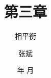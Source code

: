 \documentclass[dvipsnames, svgnames, x11names]{beamer}
\title{第三章}
\subtitle{相平衡}
\author{张斌}
\institute[理工系]{河北农业大学 理工系}
\date{\the\year 年 \the\month 月}
\begin{document}
	\begin{frame}
		\titlepage
		\thispagestyle{empty}
		\addtocounter{framenumber}{-1}
	\end{frame}

	\begin{frame}{}
        \begin{center}
            {\Huge {}}
        \end{center}
		\tableofcontents
		\thispagestyle{empty}
		\addtocounter{framenumber}{-1}
	\end{frame}







\end{document}

